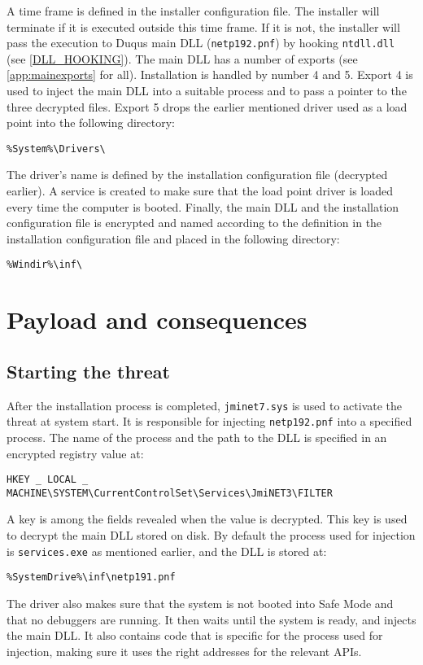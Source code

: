 \documentclass[11pt,english,a4paper]{report}
\begin{document}
A time frame is defined in the installer configuration file. The installer will terminate if it is executed outside this time frame. If it is not, the installer will pass the execution to Duqus main DLL (\texttt{netp192.pnf}) by hooking \texttt{ntdll.dll} (see \ref{DLL_HOOKING}). The main DLL has a number of exports (see \ref{app:mainexports} for all). Installation is handled by number 4 and 5. Export 4 is used to inject the main DLL into a suitable process and to pass a pointer to the three decrypted files. Export 5 drops the earlier mentioned driver used as a load point into the following directory:
\begin{lstlisting}
%System%\Drivers\ 
\end{lstlisting}
The driver's name is defined by the installation configuration file (decrypted earlier). A service is created to make sure that the load point driver is loaded every time the computer is booted. Finally, the main DLL and the installation configuration file is encrypted and named according to the definition in the installation configuration file and placed in the following directory:
\begin{lstlisting}
%Windir%\inf\ 
\end{lstlisting}

\chapter{Payload and consequences}
\section{Starting the threat}
After the installation process is completed, \texttt{jminet7.sys} is used to activate the threat at system start. It is responsible for injecting \texttt{netp192.pnf} into a specified process. The name of the process and the path to the DLL is specified in an encrypted registry value at:
\begin{lstlisting}
HKEY _ LOCAL _ MACHINE\SYSTEM\CurrentControlSet\Services\JmiNET3\FILTER
\end{lstlisting}
A key is among the fields revealed when the value is decrypted. This key is used to decrypt the main DLL stored on disk. By default the process used for injection is \texttt{services.exe} as mentioned earlier, and the DLL is stored at:
\begin{lstlisting}
%SystemDrive%\inf\netp191.pnf 
\end{lstlisting}
The driver also makes sure that the system is not booted into Safe Mode and that no debuggers are running. It then waits until the system is ready, and injects the main DLL. It also contains code that is specific for the process used for injection, making sure it uses the right addresses for the relevant APIs.
\end{document}
